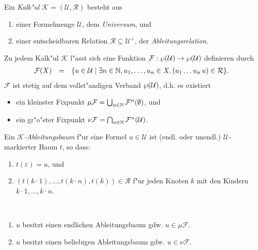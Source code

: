 \documentclass[12pt,a4paper,final]{article}
\begin{document}
\begin{definition}[Kalk"ul]
  Ein \emph{Kalk"ul} $\mathcal{K} = (\mathcal{U}, \mathcal{R})$ besteht aus
  \begin{enumerate}
  \item einer Formelmenge $\mathcal{U}$, dem \emph{Universum}, und
  \item einer entscheidbaren Relation $\mathcal{R} \subseteq \mathcal{U}^+$, der \emph{Ableitungsrelation}.
  \end{enumerate}
\end{definition}
Zu jedem Kalk"ul $\mathcal{K}$ l"asst sich eine Funktion
\mbox{$\mathcal{F}:\operatorname{\wp}(\mathcal{U}) \to \operatorname{\wp}(\mathcal{U})$} definieren durch
\[\begin{array}{rcl}
\mathcal{F}(X) &=& \{u \in \mathcal{U} \mid \exists n\in\mathbb N,u_1,\ldots,u_n\in X.\,(u_1 \ldots u_n\,u) \in\mathcal{R}\}.
\end{array}\]
$\mathcal{F}$ ist stetig auf dem vollst"andigen Verband $\operatorname{\wp}(\mathcal{U})$, d.h. es
existiert
\begin{itemize}
\item ein kleinster Fixpunkt $\mu\mathcal{F} = \bigcup_{n\in\mathbb N}\mathcal{F}^n(\emptyset)$, und
\item ein gr"o"ster Fixpunkt $\nu\mathcal{F} = \bigcap_{n\in\mathbb N}\mathcal{F}^n(\mathcal{U})$.
\end{itemize}
Ein \emph{$\mathcal{K}$-Ableitungsbaum} f"ur eine Formel $u \in \mathcal{U}$ ist (endl. oder unendl.)
$\mathcal{U}$-markierter Baum $t$, so dass:
\begin{enumerate}
\item $t(\varepsilon) = u$, und
\item $(t(k \cdot 1),\ldots,t(k \cdot n),t(k)) \in \mathcal{R}$ f"ur jeden Knoten $k$ mit den Kindern $k \cdot 1,\ldots,k \cdot n$.
\end{enumerate}

\begin{theorem} \
  \begin{enumerate}
  \item $u$ besitzt einen endlichen Ableitungsbaum gdw. $u \in \mu\mathcal{F}$.
  \item $u$ besitzt einen beliebigen Ableitungsbaum gdw. $u \in \nu\mathcal{F}$.
  \end{enumerate}
\end{theorem}
\end{document}

